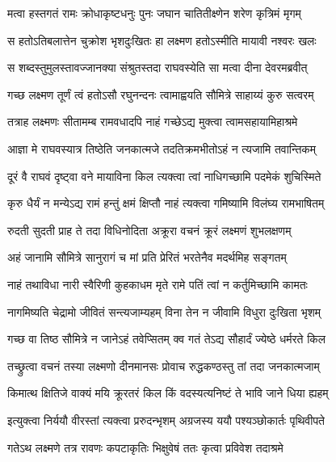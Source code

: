 \twolineshloka
{मत्वा हस्तगतं रामः क्रोधाकृष्टधनुः पुनः}
{जघान चातितीक्ष्णेन शरेण कृत्रिमं मृगम्}%

\twolineshloka
{स हतोऽतिबलात्तेन चुक्रोश भृशदुःखितः}
{हा लक्ष्मण हतोऽस्मीति मायावी नश्वरः खलः}%

\twolineshloka
{स शब्दस्तुमुलस्तावज्जानक्या संश्रुतस्तदा}
{राघवस्येति सा मत्वा दीना देवरमब्रवीत्}%

\twolineshloka
{गच्छ लक्ष्मण तूर्णं त्वं हतोऽसौ रघुनन्दनः}
{त्वामाह्वयति सौ‌मित्रे साहाय्यं कुरु सत्वरम्}%

\twolineshloka
{तत्राह लक्ष्मणः सीतामम्ब रामवधादपि}
{नाहं गच्छेऽद्य मुक्त्वा त्वामसहायामिहाश्रमे}%

\twolineshloka
{आज्ञा मे राघवस्यात्र तिष्ठेति जनकात्मजे}
{तदतिक्रमभीतोऽहं न त्यजामि तवान्तिकम्}%

\twolineshloka
{दूरं वै राघवं दृष्ट्वा वने मायाविना किल}
{त्यक्त्वा त्वां नाधिगच्छामि पदमेकं शुचिस्मिते}%

\twolineshloka
{कृरु धैर्यं न मन्येऽद्य रामं हन्तुं क्षमं क्षिप्तौ}
{नाहं त्यक्त्वा गमिष्यामि विलंघ्य रामभाषितम्}%



\twolineshloka
{रुदती सुदती प्राह ते तदा विधिनोदिता}
{अक्रूरा वचनं क्रूरं लक्ष्मणं शुभलक्षणम्}%

\twolineshloka
{अहं जानामि सौ‌मित्रे सानुरागं च मां प्रति}
{प्रेरितं भरतेनैव मदर्थमिह सङ्गतम्}%

\twolineshloka
{नाहं तथाविधा नारी स्वैरिणी कुहकाधम}
{मृते रामे पतिं त्वां न कर्तुमिच्छामि कामतः}%

\twolineshloka
{नागमिष्यति चेद्रामो जीवितं सन्त्यजाम्यहम्}
{विना तेन न जीवामि विधुरा दुःखिता भृशम्}%

\twolineshloka
{गच्छ वा तिष्ठ सौ‍मित्रे न जानेऽहं तवेप्सितम्}
{क्व गतं तेऽद्य सौहार्दं ज्येष्ठे धर्मरते किल}%

\twolineshloka
{तच्छ्रुत्वा वचनं तस्या लक्ष्मणो दीनमानसः}
{प्रोवाच रुद्धकण्ठस्तु तां तदा जनकात्मजाम्}%

\twolineshloka
{किमात्थ क्षितिजे वाक्यं मयि क्रूरतरं किल}
{किं वदस्यत्यनिष्टं ते भावि जाने धिया ह्यहम्}%

\twolineshloka
{इत्युक्त्वा निर्ययौ वीरस्तां त्यक्त्वा प्ररुदन्भृशम्}
{अग्रजस्य ययौ पश्यञ्छोकार्तः पृथिवीपते}%

\twolineshloka
{गतेऽथ लक्ष्मणे तत्र रावणः कपटाकृतिः}
{भिक्षुवेषं ततः कृत्वा प्रविवेश तदाश्रमे}%

